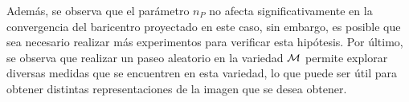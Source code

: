 Además, se observa que el parámetro $n_P$ no afecta significativamente en la convergencia del baricentro proyectado en este caso, sin embargo, es posible que sea necesario realizar más experimentos para verificar esta hipótesis.
Por último, se observa que realizar un paseo aleatorio en la variedad $\operatorname{\mathcal{M}}$ permite explorar diversas medidas que se encuentren en esta variedad, lo que puede ser útil para obtener distintas representaciones de la imagen que se desea obtener.

